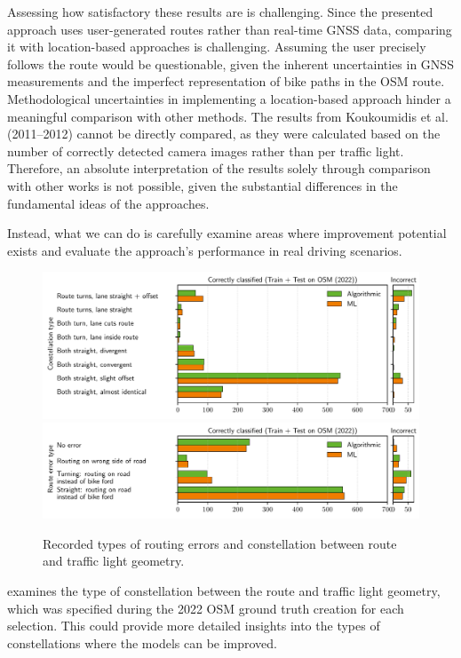 Assessing how satisfactory these results are is challenging. Since the presented approach uses user-generated routes rather than real-time GNSS data, comparing it with location-based approaches is challenging. Assuming the user precisely follows the route would be questionable, given the inherent uncertainties in GNSS measurements and the imperfect representation of bike paths in the OSM route. Methodological uncertainties in implementing a location-based approach hinder a meaningful comparison with other methods. The results from Koukoumidis et al. (2011–2012) \cite{koukoumidis_signalguru_2011, koukoumidis_leveraging_2012} cannot be directly compared, as they were calculated based on the number of correctly detected camera images rather than per traffic light. Therefore, an absolute interpretation of the results solely through comparison with other works is not possible, given the substantial differences in the fundamental ideas of the approaches.

Instead, what we can do is carefully examine areas where improvement potential exists and evaluate the approach's performance in real driving scenarios.

\begin{figure}[t]
\centering 
\includegraphics[width=\linewidth]{images/matching-constellations-osm-old.pdf} \\
\includegraphics[width=\linewidth]{images/matching-route-errors-osm-old.pdf}
\caption{Recorded types of routing errors and constellation between route and traffic light geometry.}
\label{fig:matching-constellations-osm}
\end{figure}

 examines the type of constellation between the route and traffic light geometry, which was specified during the 2022 OSM ground truth creation for each selection. This could provide more detailed insights into the types of constellations where the models can be improved.

